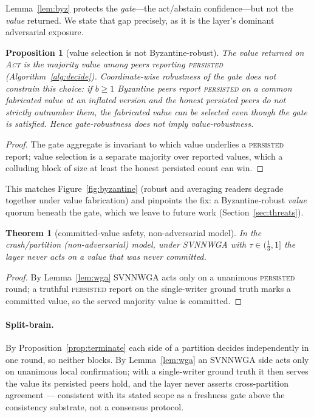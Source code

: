 \documentclass[11pt]{article}
\newtheorem{proposition}{Proposition}
\newtheorem{theorem}{Theorem}
\begin{document}
\noindent Lemma~\ref{lem:byz} protects the \emph{gate}---the act/abstain confidence---but not the
\emph{value} returned. We state that gap precisely, as it is the layer's dominant adversarial exposure.

\begin{proposition}[value selection is not Byzantine-robust]\label{prop:valbyz}
The value returned on \textsc{Act} is the majority value among peers reporting \textsc{persisted}
(Algorithm~\ref{alg:decide}). Coordinate-wise robustness of the gate does not constrain this choice: if
$b\ge1$ Byzantine peers report \textsc{persisted} on a common fabricated value at an inflated version and
the honest persisted peers do not strictly outnumber them, the fabricated value can be selected even
though the gate is satisfied. Hence gate-robustness does not imply value-robustness.
\end{proposition}
\begin{proof}
The gate aggregate is invariant to which value underlies a \textsc{persisted} report; value selection is a
separate majority over reported values, which a colluding block of size at least the honest persisted
count can win.
\end{proof}

\noindent This matches Figure~\ref{fig:byzantine} (robust and averaging readers degrade together under
value fabrication) and pinpoints the fix: a Byzantine-robust \emph{value} quorum beneath the gate, which
we leave to future work (Section~\ref{sec:threats}).

\begin{theorem}[committed-value safety, non-adversarial model]\label{thm:safety}
In the crash/partition (non-adversarial) model, under SVNNWGA with $\tau\in(\tfrac13,1]$ the layer never
acts on a value that was never committed.
\end{theorem}
\begin{proof}
By Lemma~\ref{lem:wga} SVNNWGA acts only on a unanimous \textsc{persisted} round; a truthful
\textsc{persisted} report on the single-writer ground truth marks a committed value, so the served
majority value is committed.
\end{proof}

\paragraph{Split-brain.} By Proposition~\ref{prop:terminate} each side of a partition decides
independently in one round, so neither blocks. By Lemma~\ref{lem:wga} an SVNNWGA side acts only on
unanimous local confirmation; with a single-writer ground truth it then serves the value its persisted
peers hold, and the layer never asserts cross-partition agreement --- consistent with its stated scope as
a freshness gate above the consistency substrate, not a consensus protocol.
\end{document}
